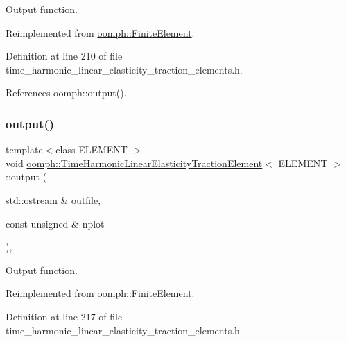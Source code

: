 Output function. 



Reimplemented from \hyperlink{classoomph_1_1FiniteElement_a2ad98a3d2ef4999f1bef62c0ff13f2a7}{oomph\+::\+Finite\+Element}.



Definition at line 210 of file time\+\_\+harmonic\+\_\+linear\+\_\+elasticity\+\_\+traction\+\_\+elements.\+h.



References oomph\+::output().

\mbox{\label{classoomph_1_1TimeHarmonicLinearElasticityTractionElement_a41af8d1a298bc901f8374ccbae137eda}} 
\subsubsection{\texorpdfstring{output()}{output()}\hspace{0.1cm}{\footnotesize\ttfamily [2/4]}}
{\footnotesize\ttfamily template$<$class E\+L\+E\+M\+E\+NT $>$ \\
void \hyperlink{classoomph_1_1TimeHarmonicLinearElasticityTractionElement}{oomph\+::\+Time\+Harmonic\+Linear\+Elasticity\+Traction\+Element}$<$ E\+L\+E\+M\+E\+NT $>$\+::output (\begin{DoxyParamCaption}\item[{std\+::ostream \&}]{outfile,  }\item[{const unsigned \&}]{nplot }\end{DoxyParamCaption})\hspace{0.3cm}{\ttfamily [inline]}, {\ttfamily [virtual]}}



Output function. 



Reimplemented from \hyperlink{classoomph_1_1FiniteElement_afa9d9b2670f999b43e6679c9dd28c457}{oomph\+::\+Finite\+Element}.



Definition at line 217 of file time\+\_\+harmonic\+\_\+linear\+\_\+elasticity\+\_\+traction\+\_\+elements.\+h.



